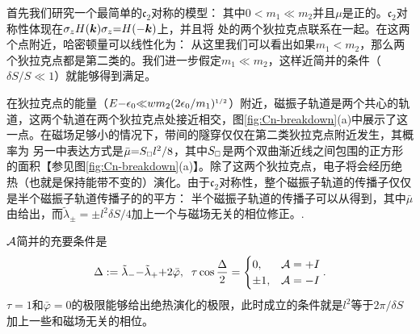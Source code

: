 首先我们研究一个最简单的$\mathfrak{c}_2$对称的模型：
其中$0{<}m_1{\ll}m_2$并且$\mu$是正的。$\mathfrak{c}_2$对称性体现在$\sigma_z H(\boldsymbol{k})\sigma_z{=}H({-}\boldsymbol{k})$上，并且将 
处的两个狄拉克点联系在一起。在这两个点附近，哈密顿量可以线性化为：
从这里我们可以看出如果$m_1{<}m_2$，那么两个狄拉克点都是第二类的。我们进一步假定$m_1{\ll}m_2$，这样近简并的条件（$\delta S/S{\ll}1$）就能够得到满足。

在狄拉克点的能量（$E{-}\epsilon_0 {\ll} wm_2(2\epsilon_0/m_1)^{\scriptscriptstyle{1/2}}$）附近，磁振子轨道是两个共心的轨道，这两个轨道在两个狄拉克点处接近相交，图\ref{fig:Cn-breakdown}(a)中展示了这一点。在磁场足够小的情况下，带间的隧穿仅仅在第二类狄拉克点附近发生，其概率为
另一中表达方式是$\bar{\mu}{=}S_{\scriptscriptstyle{\square}}l^2/8$，其中$S_{\scriptscriptstyle{\square}}$是两个双曲渐近线之间包围的正方形的面积【参见图\ref{fig:Cn-breakdown}(a)】。除了这两个狄拉克点，电子将会经历绝热（也就是保持能带不变的）演化。由于$\mathfrak{c}_2$对称性，整个磁振子轨道的传播子仅仅是半个磁振子轨道传播子的的平方：
半个磁振子轨道的传播子可以从得到，其中$\bar{\mu}$由给出，而$\tilde{\lambda}_{\pm}{=}{\pm}l^2\delta S/4$加上一个与磁场无关的相位修正。.

${\cal A}$简并的充要条件是 
\begin{align}
\Delta:= \tilde{\lambda}_-{-}\tilde{\lambda}_{+}{+}2\bar{\varphi},\;\;
\tau\cos\frac{\Delta}{2}= \begin{cases} 0, & {{\cal A}}=+I \\
                 \pm 1, & {\cal A} =-I\end{cases}.\label{c2breakdowndgncondition}
\end{align}
$\tau{=}1$和$\bar{\varphi}{=}0$的极限能够给出绝热演化的极限，此时成立的条件就是$l^2$等于$2\pi/\delta S$加上一些和磁场无关的相位。

